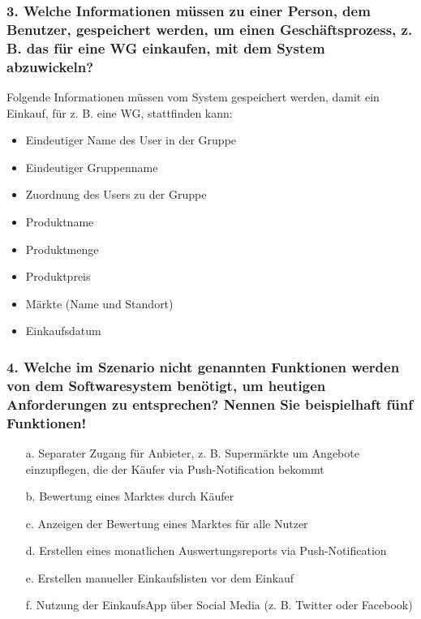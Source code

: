 \documentclass[12pt,a4paper]{article}
\begin{document}
\subsubsection*{3. Welche Informationen müssen zu einer Person, dem Benutzer, gespeichert werden, um einen Geschäftsprozess, z. B. das für eine WG einkaufen, mit dem System abzuwickeln?}
Folgende Informationen müssen vom System gespeichert werden, damit ein Einkauf, für z. B. eine WG, stattfinden kann:
\begin{itemize} 
\item Eindeutiger Name des User in der Gruppe %
\item Eindeutiger Gruppenname %
\item Zuordnung des Users zu der Gruppe %
\item Produktname
\item Produktmenge
\item Produktpreis
\item Märkte (Name und Standort)
\item Einkaufsdatum
\end{itemize}
 
\subsubsection*{4. Welche im Szenario nicht genannten Funktionen werden von dem Softwaresystem benötigt, um heutigen Anforderungen zu entsprechen? Nennen Sie beispielhaft fünf Funktionen!}
\begin{itemize}
\item[a.] Separater Zugang für Anbieter, z. B. Supermärkte um Angebote einzupflegen, die der Käufer via Push-Notification bekommt
\item[b.] Bewertung eines Marktes durch Käufer
\item[c.] Anzeigen der Bewertung eines Marktes für alle Nutzer
\item[d.] Erstellen eines monatlichen Auswertungsreports via Push-Notification 
\item[e.] Erstellen manueller Einkaufslisten vor dem Einkauf 
\item[f.] Nutzung der EinkaufsApp über Social Media (z. B. Twitter oder Facebook)
\end{itemize}
 
\end{document}
